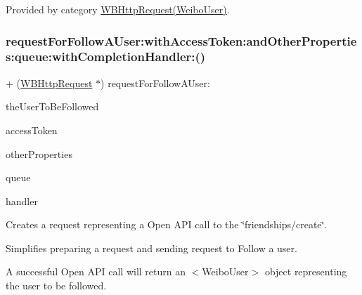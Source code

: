 Provided by category \mbox{\hyperlink{category_w_b_http_request_07_weibo_user_08_a857eebccc3b26b8d7c5bbc38a3ae2627}{W\+B\+Http\+Request(\+Weibo\+User)}}.

\mbox{\label{interface_w_b_http_request_a857eebccc3b26b8d7c5bbc38a3ae2627}} 
\subsubsection{\texorpdfstring{request\+For\+Follow\+A\+User\+:with\+Access\+Token\+:and\+Other\+Properties\+:queue\+:with\+Completion\+Handler\+:()}{requestForFollowAUser:withAccessToken:andOtherProperties:queue:withCompletionHandler:()}\hspace{0.1cm}{\footnotesize\ttfamily [2/3]}}
{\footnotesize\ttfamily + (\mbox{\hyperlink{interface_w_b_http_request}{W\+B\+Http\+Request}} $\ast$) request\+For\+Follow\+A\+User\+: \begin{DoxyParamCaption}\item[{(N\+S\+String $\ast$)}]{the\+User\+To\+Be\+Followed }\item[{withAccessToken:(N\+S\+String $\ast$)}]{access\+Token }\item[{andOtherProperties:(N\+S\+Dictionary $\ast$)}]{other\+Properties }\item[{queue:(N\+S\+Operation\+Queue $\ast$)}]{queue }\item[{withCompletionHandler:(W\+B\+Request\+Handler)}]{handler }\end{DoxyParamCaption}}

Creates a request representing a Open A\+PI call to the \char`\"{}friendships/create\char`\"{}.

Simplifies preparing a request and sending request to Follow a user.

A successful Open A\+PI call will return an $<$\+Weibo\+User$>$ object representing the user to be followed.


